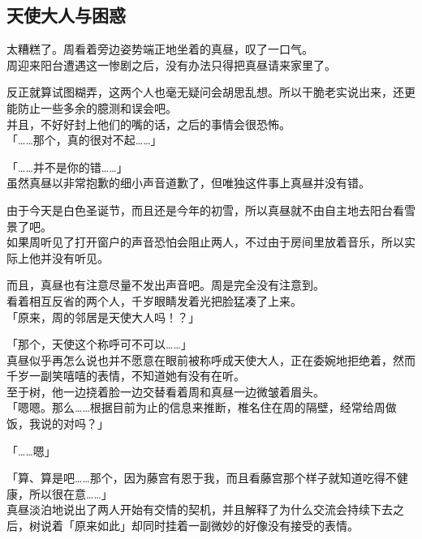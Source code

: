 \subsection{天使大人与困惑}

太糟糕了。周看着旁边姿势端正地坐着的真昼，叹了一口气。\\

周迎来阳台遭遇这一惨剧之后，没有办法只得把真昼请来家里了。

反正就算试图糊弄，这两个人也毫无疑问会胡思乱想。所以干脆老实说出来，还更能防止一些多余的臆测和误会吧。\\

并且，不好好封上他们的嘴的话，之后的事情会很恐怖。\\

「……那个，真的很对不起……」

「……并不是你的错……」\\

虽然真昼以非常抱歉的细小声音道歉了，但唯独这件事上真昼并没有错。

由于今天是白色圣诞节，而且还是今年的初雪，所以真昼就不由自主地去阳台看雪景了吧。\\

如果周听见了打开窗户的声音恐怕会阻止两人，不过由于房间里放着音乐，所以实际上他并没有听见。

而且，真昼也有注意尽量不发出声音吧。周是完全没有注意到。\\

看着相互反省的两个人，千岁眼睛发着光把脸猛凑了上来。\\

「原来，周的邻居是天使大人吗！？」

「那个，天使这个称呼可不可以……」\\

真昼似乎再怎么说也并不愿意在眼前被称呼成天使大人，正在委婉地拒绝着，然而千岁一副笑嘻嘻的表情，不知道她有没有在听。\\

至于树，他一边挠着脸一边交替看着周和真昼一边微皱着眉头。\\

「嗯嗯。那么……根据目前为止的信息来推断，椎名住在周的隔壁，经常给周做饭，我说的对吗？」

「……嗯」

「算、算是吧……那个，因为藤宫有恩于我，而且看藤宫那个样子就知道吃得不健康，所以很在意……」\\

真昼淡泊地说出了两人开始有交情的契机，并且解释了为什么交流会持续下去之后，树说着「原来如此」却同时挂着一副微妙的好像没有接受的表情。\\

